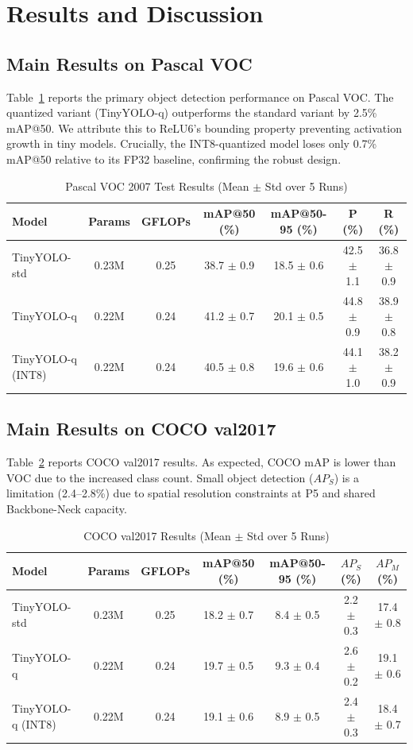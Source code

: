 \documentclass[conference]{IEEEtran}
\begin{document}
\section{Results and Discussion}

\subsection{Main Results on Pascal VOC}
Table~\ref{tab:voc_results} reports the primary object detection performance on Pascal VOC. The quantized variant (TinyYOLO-q) outperforms the standard variant by 2.5\% mAP@50. We attribute this to ReLU6's bounding property preventing activation growth in tiny models. Crucially, the INT8-quantized model loses only 0.7\% mAP@50 relative to its FP32 baseline, confirming the robust design.

\begin{table}[t]
\centering
\caption{Pascal VOC 2007 Test Results (Mean $\pm$ Std over 5 Runs)}
\label{tab:voc_results}
\begin{tabular}{lcccccc}
\toprule
Model & Params & GFLOPs & mAP@50 (\%) & mAP@50-95 (\%) & P (\%) & R (\%) \\
\midrule
TinyYOLO-std & 0.23M & 0.25 & 38.7 $\pm$ 0.9 & 18.5 $\pm$ 0.6 & 42.5 $\pm$ 1.1 & 36.8 $\pm$ 0.9 \\
TinyYOLO-q & 0.22M & 0.24 & 41.2 $\pm$ 0.7 & 20.1 $\pm$ 0.5 & 44.8 $\pm$ 0.9 & 38.9 $\pm$ 0.8 \\
TinyYOLO-q (INT8) & 0.22M & 0.24 & 40.5 $\pm$ 0.8 & 19.6 $\pm$ 0.6 & 44.1 $\pm$ 1.0 & 38.2 $\pm$ 0.9 \\
\bottomrule
\end{tabular}
\end{table}

\subsection{Main Results on COCO val2017}
Table~\ref{tab:coco_results} reports COCO val2017 results. As expected, COCO mAP is lower than VOC due to the increased class count. Small object detection ($AP_S$) is a limitation (2.4--2.8\%) due to spatial resolution constraints at P5 and shared Backbone-Neck capacity.

\begin{table}[t]
\centering
\caption{COCO val2017 Results (Mean $\pm$ Std over 5 Runs)}
\label{tab:coco_results}
\begin{tabular}{lcccccc}
\toprule
Model & Params & GFLOPs & mAP@50 (\%) & mAP@50-95 (\%) & $AP_S$ (\%) & $AP_M$ (\%) \\
\midrule
TinyYOLO-std & 0.23M & 0.25 & 18.2 $\pm$ 0.7 & 8.4 $\pm$ 0.5 & 2.2 $\pm$ 0.3 & 17.4 $\pm$ 0.8 \\
TinyYOLO-q & 0.22M & 0.24 & 19.7 $\pm$ 0.5 & 9.3 $\pm$ 0.4 & 2.6 $\pm$ 0.2 & 19.1 $\pm$ 0.6 \\
TinyYOLO-q (INT8) & 0.22M & 0.24 & 19.1 $\pm$ 0.6 & 8.9 $\pm$ 0.5 & 2.4 $\pm$ 0.3 & 18.4 $\pm$ 0.7 \\
\bottomrule
\end{tabular}
\end{table}
\end{document}

